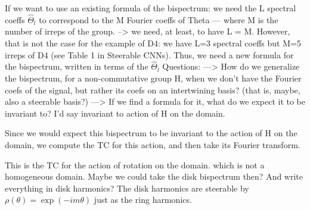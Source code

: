 \documentclass{article}
\begin{document}
If we want to use an existing formula of the bispectrum:
we need the L spectral coeffs $\hat \Theta_l$ to correspond to the M Fourier coeffs of Theta  — where M is the number of irreps of the group.
--> we need, at least, to have L = M.
However, that is not the case for the example of D4: we have L=3 spectral coeffs but M=5 irreps of D4 (see Table 1 in Steerable CNNs).
Thus, we need a new formula for the bispectrum, written in terms of the $\hat \Theta_l$
Questions:
---> How do we generalize the bispectrum, for a non-commutative group H, when we don’t have the Fourier coefs of the signal, but rather its coefs on an intertwining basis? (that is, maybe, also a steerable basis?)
---> If we find a formula for it, what do we expect it to be invariant to? I’d say invariant to action of H on the domain.

Since we would expect this bispectrum to be invariant to the action of H on the domain, we compute the TC for this action, and then take its Fourier transform.

This is the TC for the action of rotation on the domain. which is not a homogeneous domain. Maybe we could take the disk bispectrum then? And write everything in disk harmonics? The disk harmonics are steerable by $\rho(\theta) = \exp(-im\theta)$ just as the ring harmonics.
\end{document}
